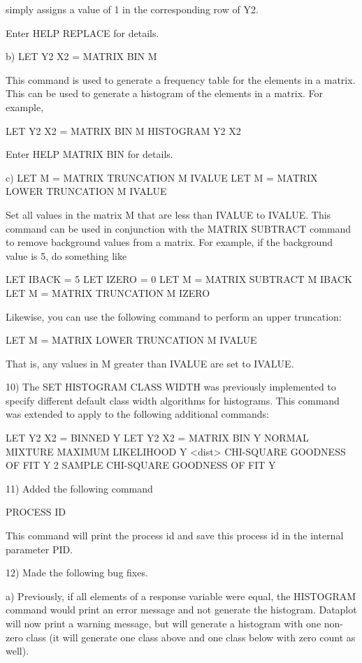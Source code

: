 {       simply assigns a value of 1 in the corresponding row of Y2.
   
       Enter HELP REPLACE for details.

    b) LET Y2 X2 = MATRIX BIN M

       This command is used to generate a frequency table for
       the elements in a matrix.  This can be used to generate
       a histogram of the elements in a matrix.  For example,
 
          LET Y2 X2 = MATRIX BIN M
          HISTOGRAM Y2 X2

       Enter HELP MATRIX BIN for details.

    c) LET M = MATRIX TRUNCATION M IVALUE
       LET M = MATRIX LOWER TRUNCATION M IVALUE

       Set all values in the matrix M that are less than
       IVALUE to IVALUE.  This command can be used in conjunction
       with the MATRIX SUBTRACT command to remove background
       values from a matrix.  For example, if the background
       value is 5, do something like

           LET IBACK = 5
           LET IZERO = 0
           LET M = MATRIX SUBTRACT M IBACK
           LET M = MATRIX TRUNCATION M IZERO

       Likewise, you can use the following command to perform
       an upper truncation:

          LET M = MATRIX LOWER TRUNCATION M IVALUE

       That is, any values in M greater than IVALUE are set to
       IVALUE.

10) The SET HISTOGRAM CLASS WIDTH was previously implemented to
    specify different default class width algorithms for
    histograms.  This command was extended to apply to the
    following additional commands:

      LET Y2 X2 = BINNED Y
      LET Y2 X2 = MATRIX BIN Y
      NORMAL MIXTURE MAXIMUM LIKELIHOOD Y
      <dist> CHI-SQUARE GOODNESS OF FIT Y
      2 SAMPLE CHI-SQUARE GOODNESS OF FIT Y

11) Added the following command

        PROCESS ID

    This command will print the process id and save this
    process id in the internal parameter PID.

12) Made the following bug fixes.

    a) Previously, if all elements of a response variable were
       equal, the HISTOGRAM command would print an error message
       and not generate the histogram.  Dataplot will now
       print a warning message, but will generate a histogram
       with one non-zero class (it will generate one class above
       and one class below with zero count as well).

}
